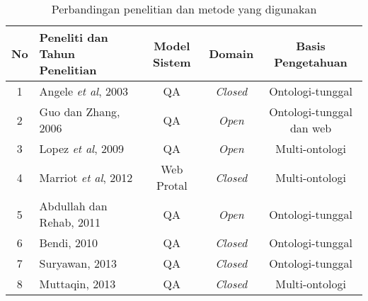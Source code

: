 \begin{landscape}
\begin{table}[h]
	\caption{Perbandingan penelitian dan metode yang digunakan}
	\label{table:perbandingan_penelitian}
	\begin{tabularx}{\linewidth}{|c|>{\centering\setlength}X|c|c|c|}
		\hline
		No & Peneliti dan Tahun Penelitian & Model Sistem & Domain & Basis Pengetahuan \\
		\hline
		1 & Angele \emph{et al}, 2003 & QA & \emph{Closed} & Ontologi-tunggal \\
		\hline
		2 & Guo dan Zhang, 2006 & QA & \emph{Open} & Ontologi-tunggal dan web \\
		\hline
		3 & Lopez \emph{et al}, 2009 & QA & \emph{Open} & Multi-ontologi \\
		\hline
		4 & Marriot \emph{et al}, 2012 & Web Protal & \emph{Closed} & Multi-ontologi \\
		\hline
		5 & Abdullah dan Rehab, 2011 & QA & \emph{Open} & Ontologi-tunggal \\
		\hline
		6 & Bendi, 2010 & QA & \emph{Closed} & Ontologi-tunggal \\
		\hline
		7 & Suryawan, 2013 & QA & \emph{Closed} & Ontologi-tunggal \\
		\hline
		8 & Muttaqin, 2013 & QA & \emph{Closed} & Multi-ontologi \\
		\hline
	\end{tabularx}
\end{table}
\end{landscape}